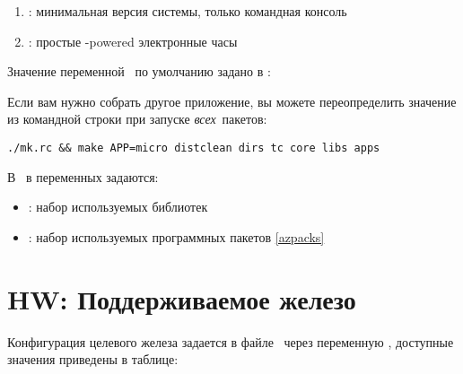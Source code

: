 \begin{enumerate}
  \item {}: минимальная версия системы, только командная консоль
  \item {}: простые \linux-powered электронные часы
\end{enumerate}

Значение переменной \ по умолчанию задано в :


Если вам нужно собрать другое приложение, вы можете переопределить значение из
командной строки при запуске \emph{всех}\ пакетов:

\begin{verbatim}
./mk.rc && make APP=micro distclean dirs tc core libs apps
\end{verbatim}

В \ в переменных задаются:

\begin{itemize}
  \item {}: набор используемых библиотек
  \item {}: набор используемых программных пакетов \ref{azpacks}
\end{itemize}



\section{HW: Поддерживаемое железо}\label{azhw}

Конфигурация целевого железа задается в файле \ через
переменную , доступные значения приведены в таблице:

